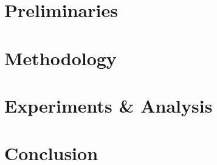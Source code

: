 \section{Preliminaries}


\section{Methodology}


\section{Experiments \& Analysis}\label{sec:ExpRes}


\section{Conclusion}





\appendix
%

